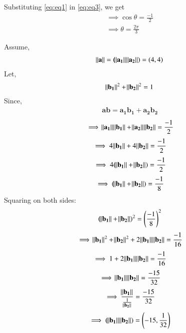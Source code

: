 \documentclass[12pt,-letter paper]{article}
\let\vec\mathbf{}
\let\vec\mathbf{}
\let\vec\mathbf{}
\providecommand{\brak}[1]{\ensuremath{\left(#1\right)}}
\providecommand{\brak}[1]{\ensuremath{\left(#1\right)}}
\begin{document}
\begin{enumerate}
Substituting \eqref{eq:eq1} in \eqref{eq:eq3}, we get
\begin{align}
	\implies \cos{\theta}=\frac{-1}{2}
	\\
	\implies \theta=\frac{2\pi}{3}
\end{align}

Assume, 
\begin{align}
	    \norm{\vec{a}}=(\norm{\vec{a_1}}\vec{\norm{a_2}}) = (4,4)
    \end{align}
Let, 
\begin{align}
\norm{\vec{b_1}}^2+\norm{\vec{b_2}}^2 =1 
\end{align}
Since, 
\begin{align}
\vec{a}\vec{b}= \vec{a_1}\vec{b_1} + \vec{a_2}\vec{b_2} 
\end{align}
    \begin{align}
\implies \norm{\vec{a_1}}\norm{\vec{b_1}}+\norm{\vec{a_2}}\norm{\vec{b_2}}= \frac{-1}{2}
    \end{align}
    \begin{align}
 \implies 4\norm{\vec{b_1}}+ 4\norm{\vec{b_2}} =\frac{-1}{2}
    \end{align}
    \begin{align}
 \implies   4(\norm{\vec{b_1}}+\norm{\vec{b_2}}) = \frac{-1}{2}
    \end{align}
    \begin{align}
   \implies (\norm{\vec{b_1}}+\norm{\vec{b_2}}) = \frac{-1}{8}
    \end{align}
    Squaring on both sides:
  \begin{align}
  (\norm{\vec{b_1}}+\norm{\vec{b_2}})^2 =\brak{\frac{-1}{8}}^2
  \end{align}
  \begin{align}
 \implies \norm{\vec{b_1}}^2+\norm{\vec{b_2}}^2+2\norm{\vec{b_1}}\norm{\vec{b_2}} =\frac{-1}{16}
  \end{align}
  \begin{align}
 \implies  1+2\norm{\vec{b_1}}\norm{\vec{b_2}} =\frac{-1}{16}
\end{align}
\begin{align}
\implies \norm{\vec{b_1}}\norm{\vec{b_2}} = \frac{-15}{32}
  \end{align}  
  \begin{align}
\implies \frac{\norm{\vec{b_1}}}{\frac{1}{\norm{\vec{b_2}}}} = \frac{-15}{32}
  \end{align}
  \begin{align}
 \implies  (\norm{\vec{b_1}}\vec{\norm{b_2}}) = \brak{-15,\frac{1}{32}}

\end{align}
\end{enumerate}
\end{document}
